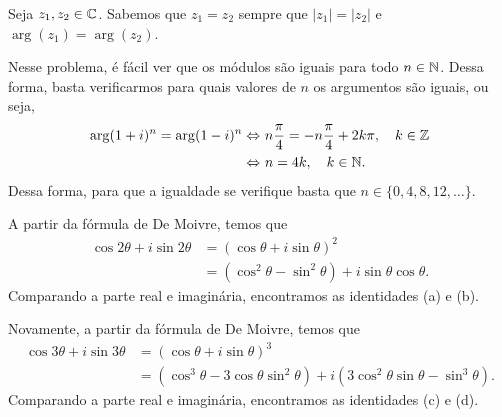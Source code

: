 
\begin{questions}

\begin{solution}
    Seja $z_1,z_2\in{\mathbb C}$. Sabemos que $z_1 = z_2$ sempre que $|z_1|=|z_2|$ e $\arg(z_1)=\arg(z_2)$.
    
    Nesse problema, é fácil ver que os módulos são iguais para todo $n\in{\mathbb N}$. Dessa forma, basta verificarmos para quais valores de $n$ os argumentos são iguais, ou seja,
    \begin{align*}
    \arg(1 + i)^n = \arg(1 - i)^n
        \Leftrightarrow~ & n \frac{\pi}{4} = -n \frac{\pi}{4} + 2 k \pi,\quad k\in{\mathbb Z} \\
        \Leftrightarrow~ & n = 4 k,\quad k\in{\mathbb N}.
    \end{align*}
    Dessa forma, para que a igualdade se verifique basta que $n\in\{0,4,8,12,\dots\}.$
\end{solution}

\begin{solution}
    A partir da fórmula de De Moivre, temos que
    \begin{align*}
        \cos 2\theta + i \sin 2\theta &= (\cos\theta + i \sin\theta)^2 \\
            &= (\cos^2\theta - \sin^2\theta) + i \sin\theta \cos\theta.
    \end{align*}
    Comparando a parte real e imaginária, encontramos as identidades (a) e (b).
    
    Novamente, a partir da fórmula de De Moivre, temos que
    \begin{align*}
        \cos 3\theta + i \sin 3\theta &= (\cos\theta + i \sin\theta)^3 \\
            &= (\cos^3\theta - 3\cos\theta \sin^2\theta) + i (3\cos^2\theta \sin\theta - \sin^3\theta).
    \end{align*}
    Comparando a parte real e imaginária, encontramos as identidades (c) e (d).
    

\end{solution}
\end{questions}
